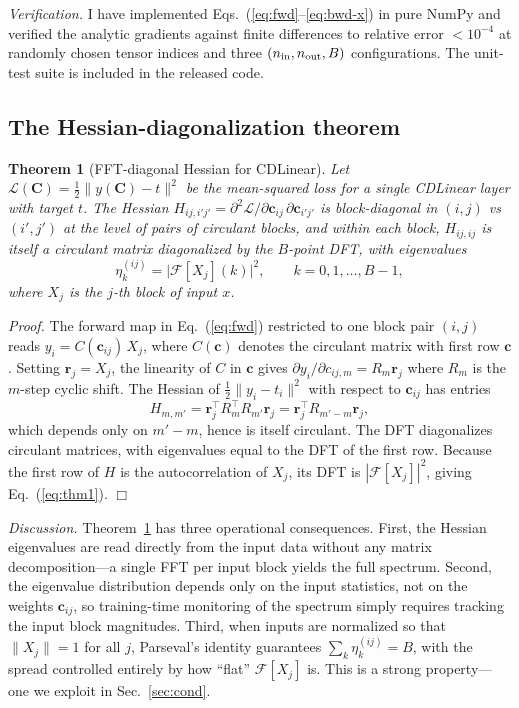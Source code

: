 \documentclass[aps,prx,onecolumn,11pt,nofootinbib,longbibliography]{revtex4-2}
\newtheorem{theorem}{Theorem}
\newcommand{\F}{\mathcal{F}}
\newcommand{\loss}{\mathcal{L}}
\begin{document}
\textit{Verification.}  I have implemented Eqs.~(\ref{eq:fwd}--\ref{eq:bwd-x})
in pure NumPy and verified the analytic gradients against finite differences
to relative error $< 10^{-4}$ at randomly chosen tensor indices and three
$(n_{\rm in}, n_{\rm out}, B)$ configurations.  The unit-test suite is
included in the released code.

\subsection{The Hessian-diagonalization theorem}

\begin{theorem}[FFT-diagonal Hessian for CDLinear]
\label{thm:hessian}
Let $\loss(\mathbf{C}) = \tfrac12 \|y(\mathbf{C}) - t\|^2$ be the
mean-squared loss for a single CDLinear layer with target $t$.  The Hessian
$H_{ij,i'j'} = \partial^2 \loss /
\partial \mathbf{c}_{ij}\,\partial \mathbf{c}_{i'j'}$ is block-diagonal in
$(i,j)$ vs $(i',j')$ at the level of pairs of circulant blocks, and within
each block, $H_{ij,ij}$ is itself a circulant matrix
diagonalized by the $B$-point DFT, with eigenvalues
\begin{equation}
\eta_k^{(ij)}
= \bigl|\F[X_j](k)\bigr|^2,
\qquad k = 0, 1, \ldots, B-1,
\label{eq:thm1}
\end{equation}
where $X_j$ is the $j$-th block of input $x$.
\end{theorem}

\textit{Proof.}  The forward map in Eq.~(\ref{eq:fwd}) restricted to one block
pair $(i,j)$ reads $y_i = C(\mathbf{c}_{ij})\,X_j$, where
$C(\mathbf{c})$ denotes the circulant matrix with first row $\mathbf{c}$.
Setting $\mathbf{r}_j = X_j$, the linearity of $C$ in $\mathbf{c}$ gives
$\partial y_i / \partial c_{ij,m} = R_m \mathbf{r}_j$ where $R_m$ is the
$m$-step cyclic shift.  The Hessian of $\tfrac12\|y_i - t_i\|^2$ with respect
to $\mathbf{c}_{ij}$ has entries
\begin{equation}
H_{m,m'} = \mathbf{r}_j^\top R_m^\top R_{m'} \mathbf{r}_j
        = \mathbf{r}_j^\top R_{m'-m} \mathbf{r}_j,
\end{equation}
which depends only on $m'-m$, hence is itself circulant.  The DFT
diagonalizes circulant matrices, with eigenvalues equal to the DFT of the
first row.  Because the first row of $H$ is the autocorrelation of $X_j$,
its DFT is $|\F[X_j]|^2$, giving Eq.~(\ref{eq:thm1}). $\Box$

\textit{Discussion.}  Theorem~\ref{thm:hessian} has three operational
consequences.  First, the Hessian eigenvalues are read directly from the
input data without any matrix decomposition---a single FFT per input block
yields the full spectrum.  Second, the eigenvalue distribution depends only
on the input statistics, not on the weights $\mathbf{c}_{ij}$, so
training-time monitoring of the spectrum simply requires tracking the input
block magnitudes.  Third, when inputs are normalized so that $\|X_j\| = 1$
for all $j$, Parseval's identity guarantees
$\sum_k \eta_k^{(ij)} = B$, with the spread controlled entirely by how
``flat'' $\F[X_j]$ is.  This is a strong property---one we exploit in
Sec.~\ref{sec:cond}.
\end{document}
